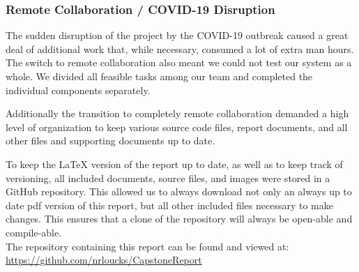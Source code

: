 		\subsubsection{Remote Collaboration / COVID-19 Disruption}
		\par The sudden disruption of the project by the COVID-19 outbreak caused a great deal of additional work that, while necessary, consumed a lot of extra man hours. The switch to remote collaboration also meant we could not test our system as a whole. We divided all feasible tasks among our team and completed the individual components separately. 
		\newpage
		\par Additionally the transition to completely remote collaboration demanded a high level of organization to keep various source code files, report documents, and all other files and supporting documents up to date.
		\par To keep the LaTeX version of the report up to date, as well as to keep track of versioning, all included documents, source files, and images were stored in a GitHub repository. This allowed us to always download not only an always up to date pdf version of this report, but all other included files necessary to make changes. This ensures that a clone of the repository will always be open-able and compile-able. \\
		The repository containing this report can be found and viewed at: \\
		\url{https://github.com/nrloucks/CapstoneReport} 